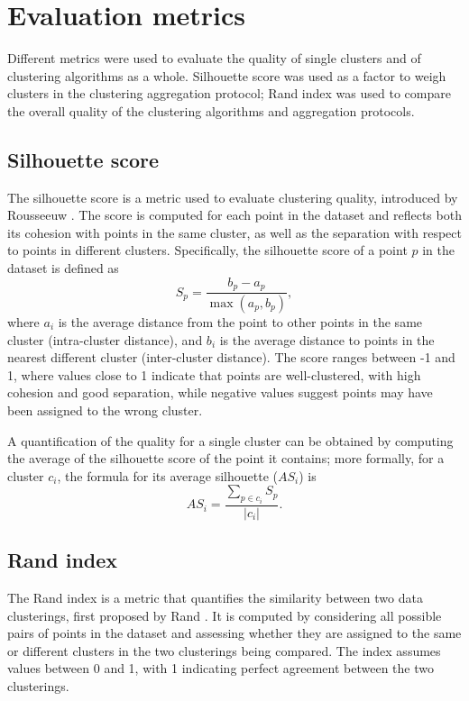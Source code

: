 \section{Evaluation metrics}
Different metrics were used to evaluate the quality of single clusters and of clustering algorithms as a whole. Silhouette score was used as a factor to weigh clusters in the clustering aggregation protocol; Rand index was used to compare the overall quality of the clustering algorithms and aggregation protocols. %

\subsection{Silhouette score}
The silhouette score is a metric used to evaluate clustering quality, introduced by Rousseeuw \cite{Rousseeuw1987}. The score is computed for each point in the dataset and reflects both its cohesion with points in the same cluster, as well as the separation with respect to points in different clusters. Specifically, the silhouette score of a point $p$ in the dataset is defined as 
\begin{equation}
  \label{eqn:silhouette}
  S_{p} = \frac{b_{p} - a_{p}}{\max({a_{p}, b_{p}})},
\end{equation}
where $a_{i}$ is the average distance from the point to other points in the same cluster (intra-cluster distance), and $b_{i}$ is the average distance to points in the nearest different cluster (inter-cluster distance). The score ranges between -1 and 1, where values close to 1 indicate that points are well-clustered, with high cohesion and good separation, while negative values suggest points may have been assigned to the wrong cluster. 

A quantification of the quality for a single cluster can be obtained by computing the average of the silhouette score of the point it contains; more formally, for a cluster $c_{i}$, the formula for its average silhouette ($AS_{i}$) is 
\begin{equation}
  \label{eqn:cluster_silhouette}
  AS_{i} = \frac{\sum_{p \in c_{i}} S_{p}}{|c_{i}|}.
\end{equation}

\subsection{Rand index}
The Rand index is a metric that quantifies the similarity between two data clusterings, first proposed by Rand \cite{Rand1971}. It is computed by considering all possible pairs of points in the dataset and assessing whether they are assigned to the same or different clusters in the two clusterings being compared. The index assumes values between 0 and 1, with 1 indicating perfect agreement between the two clusterings. 

